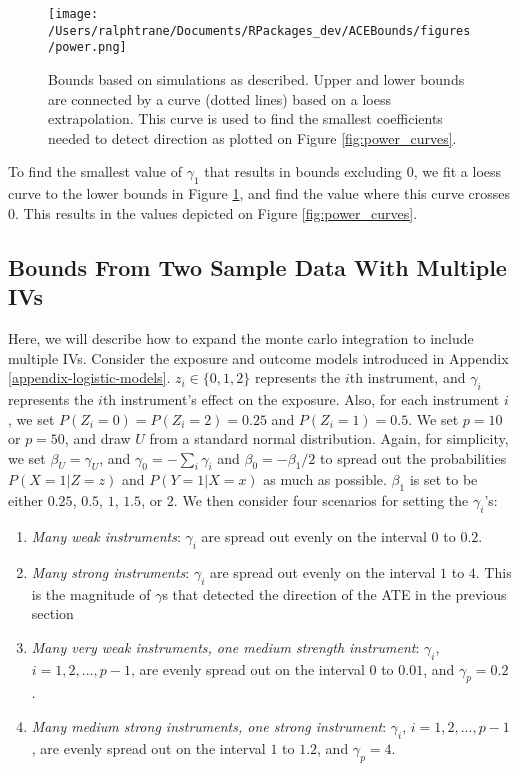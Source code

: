 \documentclass[
]{article}
\theoremstyle{plain}
\begin{document}
\clearpage
\begin{sidewaysfigure}
  \centering
  \texttt{[image: /Users/ralphtrane/Documents/RPackages\_dev/ACEBounds/figures/power.png]}
  \caption{Bounds based on simulations as described. Upper and lower bounds are connected by a curve (dotted lines) based on a loess extrapolation. This curve is used to find the smallest coefficients needed to detect direction as plotted on Figure \ref{fig:power_curves}.}
  \label{fig:power}
\end{sidewaysfigure}
\clearpage

To find the smallest value of \(\gamma_1\) that results in bounds excluding \(0\), we fit a loess curve to the lower bounds in Figure \ref{fig:power}, and find the value where this curve crosses \(0\). This results in the values depicted on Figure \ref{fig:power_curves}.

\hypertarget{bounds-from-two-sample-data-with-multiple-ivs}{%
\subsection{\texorpdfstring{Bounds From Two Sample Data With Multiple IVs \label{appendix-sim-results-multiple-IVs}}{Bounds From Two Sample Data With Multiple IVs }}\label{bounds-from-two-sample-data-with-multiple-ivs}}

Here, we will describe how to expand the monte carlo integration to include multiple IVs. Consider the exposure and outcome models introduced in Appendix \ref{appendix-logistic-models}. \(z_i \in \{0,1,2\}\) represents the \(i\)th instrument, and \(\gamma_i\) represents the \(i\)th instrument's effect on the exposure. Also, for each instrument \(i\), we set \(P(Z_i = 0) = P(Z_i = 2) = 0.25\) and \(P(Z_i = 1) = 0.5\). We set \(p = 10\) or \(p = 50\), and draw \(U\) from a standard normal distribution. Again, for simplicity, we set \(\beta_U = \gamma_U\), and \(\gamma_0 = -\sum_i \gamma_i\) and \(\beta_0 = -\beta_1/2\) to spread out the probabilities \(P(X = 1 | Z = z)\) and \(P(Y = 1 | X = x)\) as much as possible. \(\beta_1\) is set to be either \(0.25\), \(0.5\), \(1\), \(1.5\), or \(2\). We then consider four scenarios for setting the \(\gamma_i\)'s:

\begin{enumerate}
\item \emph{Many weak instruments}: \(\gamma_i\) are spread out evenly on the interval \(0\) to \(0.2\).
\item \emph{Many strong instruments}: \(\gamma_i\) are spread out evenly on the interval \(1\) to \(4\). This is the magnitude of $\gamma$s that detected the direction of the ATE in the previous section
\item \emph{Many very weak instruments, one medium strength instrument}: $\gamma_i$, $i=1,2,...,p-1$, are evenly spread out on the interval $0$ to $0.01$, and $\gamma_p = 0.2$. 
\item \emph{Many medium strong instruments, one strong instrument}: $\gamma_i$, $i=1,2,...,p-1$, are evenly spread out on the interval $1$ to $1.2$, and $\gamma_p = 4$.
\end{enumerate}
\end{document}
